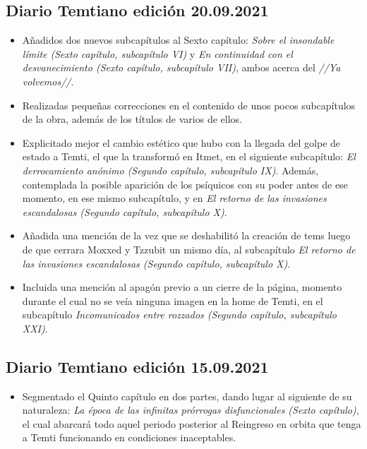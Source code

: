 \documentclass[
]{book}
\providecommand{\tightlist}{%
  \setlength{\itemsep}{0pt}\setlength{\parskip}{0pt}}
\begin{document}
\hypertarget{diario-temtiano-ediciuxf3n-20.09.2021}{%
\subsection*{Diario Temtiano edición 20.09.2021}\label{diario-temtiano-ediciuxf3n-20.09.2021}}

\begin{itemize}
\item
  Añadidos dos nuevos subcapítulos al Sexto capítulo: \emph{Sobre el insondable límite (Sexto capítulo, subcapítulo VI)} y \emph{En continuidad con el desvanecimiento (Sexto capítulo, subcapítulo VII)}, ambos acerca del \emph{//Ya volvemos//}.
\item
  Realizadas pequeñas correcciones en el contenido de unos pocos subcapítulos de la obra, además de los títulos de varios de ellos.
\item
  Explicitado mejor el cambio estético que hubo con la llegada del golpe de estado a Temti, el que la transformó en Itmet, en el siguiente subcapítulo: \emph{El derrocamiento anónimo (Segundo capítulo, subcapítulo IX)}. Además, contemplada la posible aparición de los psíquicos con su poder antes de ese momento, en ese mismo subcapítulo, y en \emph{El retorno de las invasiones escandalosas (Segundo capítulo, subcapítulo X)}.
\item
  Añadida una mención de la vez que se deshabilitó la creación de tems luego de que cerrara Moxxed y Tzzubit un mismo día, al subcapítulo \emph{El retorno de las invasiones escandalosas (Segundo capítulo, subcapítulo X)}.
\item
  Incluida una mención al apagón previo a un cierre de la página, momento durante el cual no se veía ninguna imagen en la home de Temti, en el subcapítulo \emph{Incomunicados entre rozzados (Segundo capítulo, subcapítulo XXI)}.
\end{itemize}

\hypertarget{diario-temtiano-ediciuxf3n-15.09.2021}{%
\subsection*{Diario Temtiano edición 15.09.2021}\label{diario-temtiano-ediciuxf3n-15.09.2021}}

\begin{itemize}
\tightlist
\item
  Segmentado el Quinto capítulo en dos partes, dando lugar al siguiente de su naturaleza: \emph{La época de las infinitas prórrogas disfuncionales (Sexto capítulo)}, el cual abarcará todo aquel periodo posterior al Reingreso en orbita que tenga a Temti funcionando en condiciones inaceptables.
\end{itemize}
\end{document}
